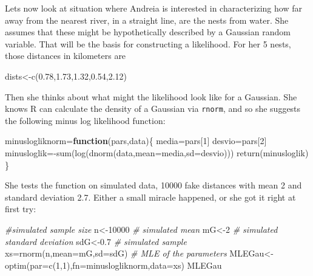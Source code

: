 \documentclass[
]{book}
\newenvironment{Shaded}{\begin{snugshade}}{\end{snugshade}}
\newcommand{\AttributeTok}[1]{\textcolor[rgb]{0.77,0.63,0.00}{#1}}
\newcommand{\CommentTok}[1]{\textcolor[rgb]{0.56,0.35,0.01}{\textit{#1}}}
\newcommand{\ControlFlowTok}[1]{\textcolor[rgb]{0.13,0.29,0.53}{\textbf{#1}}}
\newcommand{\DecValTok}[1]{\textcolor[rgb]{0.00,0.00,0.81}{#1}}
\newcommand{\FloatTok}[1]{\textcolor[rgb]{0.00,0.00,0.81}{#1}}
\newcommand{\FunctionTok}[1]{\textcolor[rgb]{0.00,0.00,0.00}{#1}}
\newcommand{\NormalTok}[1]{#1}
\newcommand{\OtherTok}[1]{\textcolor[rgb]{0.56,0.35,0.01}{#1}}
\newcommand{\SpecialCharTok}[1]{\textcolor[rgb]{0.00,0.00,0.00}{#1}}
\begin{document}
Lets now look at situation where Andreia is interested in characterizing how far away from the nearest river, in a straight line, are the nests from water. She assumes that these might be hypothetically described by a Gaussian random variable. That will be the basis for constructing a likelihood. For her 5 nests, those distances in kilometers are

\begin{Shaded}
\begin{Highlighting}[]
\NormalTok{dists}\OtherTok{\textless{}{-}}\FunctionTok{c}\NormalTok{(}\FloatTok{0.78}\NormalTok{,}\FloatTok{1.73}\NormalTok{,}\FloatTok{1.32}\NormalTok{,}\FloatTok{0.54}\NormalTok{,}\FloatTok{2.12}\NormalTok{)}
\end{Highlighting}
\end{Shaded}

Then she thinks about what might the likelihood look like for a Gaussian. She knows R can calculate the density of a Gaussian via \texttt{rnorm}, and so she suggests the following minus log likelihood function:

\begin{Shaded}
\begin{Highlighting}[]
\NormalTok{minuslogliknorm}\OtherTok{=}\ControlFlowTok{function}\NormalTok{(pars,data)\{}
\NormalTok{  media}\OtherTok{=}\NormalTok{pars[}\DecValTok{1}\NormalTok{]}
\NormalTok{  desvio}\OtherTok{=}\NormalTok{pars[}\DecValTok{2}\NormalTok{]}
\NormalTok{  minusloglik}\OtherTok{=}\SpecialCharTok{{-}}\FunctionTok{sum}\NormalTok{(}\FunctionTok{log}\NormalTok{(}\FunctionTok{dnorm}\NormalTok{(data,}\AttributeTok{mean=}\NormalTok{media,}\AttributeTok{sd=}\NormalTok{desvio)))}
  \FunctionTok{return}\NormalTok{(minusloglik)}
\NormalTok{\}}
\end{Highlighting}
\end{Shaded}

She tests the function on simulated data, 10000 fake distances with mean 2 and standard deviation 2.7. Either a small miracle happened, or she got it right at first try:

\begin{Shaded}
\begin{Highlighting}[]
\CommentTok{\#simulated sample size}
\NormalTok{n}\OtherTok{\textless{}{-}}\DecValTok{10000}
\CommentTok{\# simulated mean}
\NormalTok{mG}\OtherTok{\textless{}{-}}\DecValTok{2}
\CommentTok{\# simulated standard deviation}
\NormalTok{sdG}\OtherTok{\textless{}{-}}\FloatTok{0.7}
\CommentTok{\# simulated sample}
\NormalTok{xs}\OtherTok{=}\FunctionTok{rnorm}\NormalTok{(n,}\AttributeTok{mean=}\NormalTok{mG,}\AttributeTok{sd=}\NormalTok{sdG)}
\CommentTok{\# MLE of the parameters}
\NormalTok{MLEGau}\OtherTok{\textless{}{-}}\FunctionTok{optim}\NormalTok{(}\AttributeTok{par=}\FunctionTok{c}\NormalTok{(}\DecValTok{1}\NormalTok{,}\DecValTok{1}\NormalTok{),}\AttributeTok{fn=}\NormalTok{minuslogliknorm,}\AttributeTok{data=}\NormalTok{xs)}
\NormalTok{MLEGau}
\end{Highlighting}
\end{Shaded}
\end{document}
